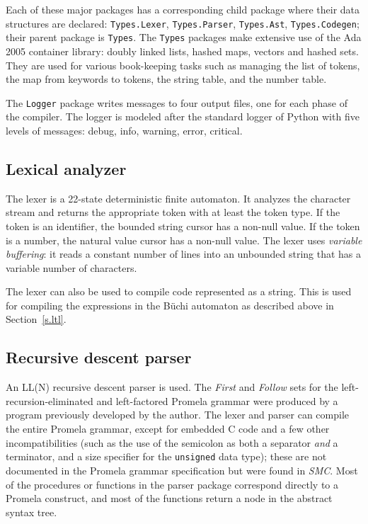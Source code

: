\documentclass[11pt]{article}
\newcommand*{\smc}{\textit{SMC}}
\newcommand*{\p}[1]{\texttt{#1}}
\begin{document}
Each of these major packages has a corresponding child package where
their data structures are declared: \p{Types.Lexer}, \p{Types.Parser},
\p{Types.Ast}, \p{Types.Codegen}; their parent package is \p{Types}. The
\p{Types} packages make extensive use of the Ada 2005 container library:
doubly linked lists, hashed maps, vectors and hashed sets. They are used
for various book-keeping tasks such as managing the list of tokens, the
map from keywords to tokens, the string table, and the number table.

The \p{Logger} package writes messages to four output files, one for
each phase of the compiler. The logger is modeled after the standard
logger of Python with five levels of messages: debug, info, warning, error,
critical.

\subsection{Lexical analyzer}

The lexer is a 22-state deterministic finite automaton. It analyzes the
character stream and returns the appropriate token with at least the
token type. If the token is an identifier, the bounded string cursor has
a non-null value. If the token is a number, the natural value cursor has
a non-null value. The lexer uses \emph{variable buffering}: it reads a
constant number of lines into an unbounded string that has a variable
number of characters.

The lexer can also be used to compile code represented as a string. This
is used for compiling the expressions in the B\"uchi automaton as
described above in Section~\ref{s.ltl}.

\subsection{Recursive descent parser}

An LL(N) recursive descent parser is used. The \emph{First} and
\emph{Follow} sets for the left-recursion-eliminated and left-factored
Promela grammar were produced by a program previously developed by the
author. The lexer and parser can compile the entire Promela grammar,
except for embedded C code and a few other incompatibilities (such as
the use of the semicolon as both a separator \emph{and} a terminator,
and a size specifier for the \p{unsigned} data type); these are not
documented in the Promela grammar specification but were found in
\smc{}. Most of the procedures or functions in the parser package
correspond directly to a Promela construct, and most of the functions
return a node in the abstract syntax tree.
\end{document}

